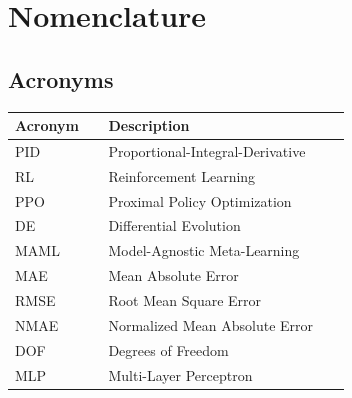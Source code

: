 \documentclass[DTMColor]{ROB-New}
\begin{document}
\nopagebreak[4]\vspace{-6pt}
\section*{Nomenclature}

\subsection*{Acronyms}
\begin{tabular}{@{}p{0.25\linewidth}p{0.65\linewidth}@{}}
\hline
\textbf{Acronym} & \textbf{Description} \\
\hline
PID & Proportional-Integral-Derivative \\
RL & Reinforcement Learning \\
PPO & Proximal Policy Optimization \\
DE & Differential Evolution \\
MAML & Model-Agnostic Meta-Learning \\
MAE & Mean Absolute Error \\
RMSE & Root Mean Square Error \\
NMAE & Normalized Mean Absolute Error \\
DOF & Degrees of Freedom \\
MLP & Multi-Layer Perceptron \\
\hline
\end{tabular}
\end{document}
